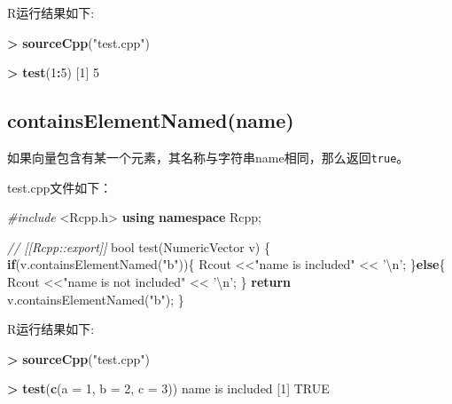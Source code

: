 \documentclass[]{ctexbook}
\newenvironment{Shaded}{\begin{snugshade}}{\end{snugshade}}
\newcommand{\KeywordTok}[1]{\textcolor[rgb]{0.13,0.29,0.53}{\textbf{#1}}}
\newcommand{\DataTypeTok}[1]{\textcolor[rgb]{0.13,0.29,0.53}{#1}}
\newcommand{\DecValTok}[1]{\textcolor[rgb]{0.00,0.00,0.81}{#1}}
\newcommand{\SpecialCharTok}[1]{\textcolor[rgb]{0.00,0.00,0.00}{#1}}
\newcommand{\StringTok}[1]{\textcolor[rgb]{0.31,0.60,0.02}{#1}}
\newcommand{\ImportTok}[1]{#1}
\newcommand{\CommentTok}[1]{\textcolor[rgb]{0.56,0.35,0.01}{\textit{#1}}}
\newcommand{\OtherTok}[1]{\textcolor[rgb]{0.56,0.35,0.01}{#1}}
\newcommand{\ControlFlowTok}[1]{\textcolor[rgb]{0.13,0.29,0.53}{\textbf{#1}}}
\newcommand{\OperatorTok}[1]{\textcolor[rgb]{0.81,0.36,0.00}{\textbf{#1}}}
\newcommand{\PreprocessorTok}[1]{\textcolor[rgb]{0.56,0.35,0.01}{\textit{#1}}}
\newcommand{\NormalTok}[1]{#1}
\begin{document}
R运行结果如下:

\begin{Shaded}
\begin{Highlighting}[]
\OperatorTok{>}\StringTok{ }\KeywordTok{sourceCpp}\NormalTok{(}\StringTok{"test.cpp"}\NormalTok{)}

\OperatorTok{>}\StringTok{ }\KeywordTok{test}\NormalTok{(}\DecValTok{1}\OperatorTok{:}\DecValTok{5}\NormalTok{)}
\NormalTok{[}\DecValTok{1}\NormalTok{] }\DecValTok{5}
\end{Highlighting}
\end{Shaded}

\subsection{containsElementNamed(name)}\label{containsEN}

如果向量包含有某一个元素，其名称与字符串name相同，那么返回\texttt{true}。

test.cpp文件如下：

\begin{Shaded}
\begin{Highlighting}[]
\PreprocessorTok{#include }\ImportTok{<Rcpp.h>}
\KeywordTok{using} \KeywordTok{namespace}\NormalTok{ Rcpp;}

\CommentTok{// [[Rcpp::export]]}
\DataTypeTok{bool}\NormalTok{ test(NumericVector v) \{}
    \ControlFlowTok{if}\NormalTok{(v.containsElementNamed(}\StringTok{"b"}\NormalTok{))\{}
\NormalTok{        Rcout <<}\StringTok{"name is included"}\NormalTok{ << }\StringTok{'}\SpecialCharTok{\textbackslash{}n}\StringTok{'}\NormalTok{;}
\NormalTok{    \}}\ControlFlowTok{else}\NormalTok{\{}
\NormalTok{        Rcout <<}\StringTok{"name is not included"}\NormalTok{ << }\StringTok{'}\SpecialCharTok{\textbackslash{}n}\StringTok{'}\NormalTok{;}
\NormalTok{    \}}
  \ControlFlowTok{return}\NormalTok{ v.containsElementNamed(}\StringTok{"b"}\NormalTok{);}
\NormalTok{\}}
\end{Highlighting}
\end{Shaded}

R运行结果如下:

\begin{Shaded}
\begin{Highlighting}[]
\OperatorTok{>}\StringTok{ }\KeywordTok{sourceCpp}\NormalTok{(}\StringTok{"test.cpp"}\NormalTok{)}

\OperatorTok{>}\StringTok{ }\KeywordTok{test}\NormalTok{(}\KeywordTok{c}\NormalTok{(}\DataTypeTok{a =} \DecValTok{1}\NormalTok{, }\DataTypeTok{b =} \DecValTok{2}\NormalTok{, }\DataTypeTok{c =} \DecValTok{3}\NormalTok{))}
\NormalTok{name is included}
\NormalTok{[}\DecValTok{1}\NormalTok{] }\OtherTok{TRUE}
\end{Highlighting}
\end{Shaded}
\end{document}
